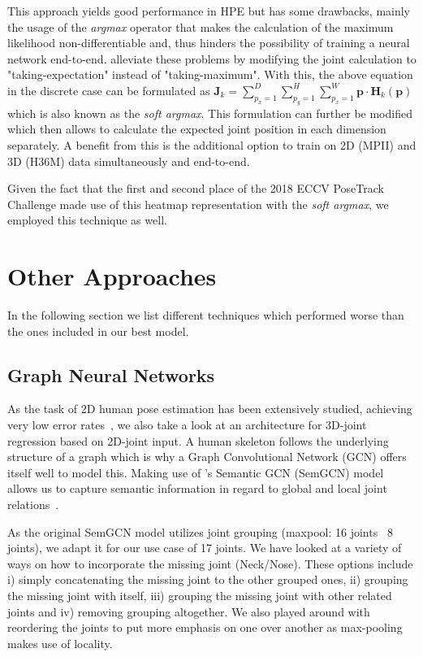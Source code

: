 This approach yields good performance in HPE but has some drawbacks, mainly the usage of the \textit{argmax} operator that makes the calculation of the maximum likelihood non-differentiable and, thus hinders the possibility of training a neural network end-to-end.
\citeauthor{sun_integral_2018-1} {\cite{sun_integral_2018-1}} alleviate these problems by modifying the joint calculation to "taking-expectation" instead of "taking-maximum".
With this, the above equation in the discrete case can be formulated as
$\mathbf{J}_k = \sum_{p_x=1}^D\sum_{p_y=1}^H\sum_{p_x=1}^W\mathbf{p}\cdot \mathbf{H}_k(\mathbf{p})$
which is also known as the \textit{soft argmax}.
This formulation can further be modified which then allows to calculate the expected joint position in each dimension separately.
A benefit from this is the additional option to train on 2D (MPII) and 3D (H36M) data simultaneously and end-to-end.

Given the fact that the first \cite{sarandi_synthetic_2018} and second \cite{sun_integral_2018} place of the 2018 ECCV PoseTrack Challenge made use of this heatmap representation with the \textit{soft argmax}, we employed this technique as well.


\section{Other Approaches}\label{approach}
In the following section we list different techniques which
performed worse than the ones included in our best model.%

\subsection{Graph Neural Networks}
As the task of 2D human pose estimation has been extensively studied, achieving very low
error rates~\cite{yang2020transpose, bulat2020skip, su2019multi},
we also take a look at an architecture for 3D-joint regression based on 2D-joint input.
A human skeleton follows the underlying structure of a graph which is why a
Graph Convolutional Network (GCN) offers itself well to model this.
Making use of \citeauthor{zhao2019gcn}'s Semantic GCN (SemGCN) model allows us to capture semantic
information in regard to global and local joint relations~\cite{zhao2019gcn}.

As the original SemGCN model utilizes joint grouping (maxpool: 16 joints \textrightarrow ~8 joints), we adapt it for
our use case of 17 joints.
We have looked at a variety of ways on how to incorporate the missing joint (Neck/Nose).
These options include i) simply concatenating the missing joint to the other grouped ones,
    ii) grouping the missing joint with itself,
    iii) grouping the missing joint with other related joints and
    iv) removing grouping altogether.
We also played around with reordering the joints to put more emphasis on one over another
as max-pooling makes use of locality.

